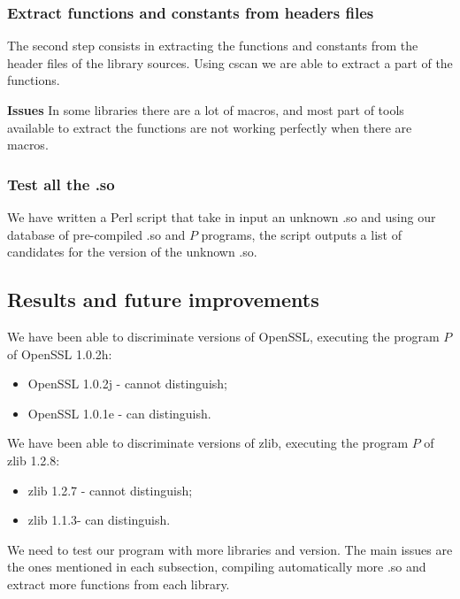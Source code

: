 \documentclass{article}
\begin{document}
   
   	\subsubsection{Extract functions and constants from headers files}
   	
    The second step consists in extracting the functions and constants from
    the header files of the library sources. Using cscan we are able to
    extract a part of the functions.
   	
    \textbf{Issues} In some libraries there are a lot of macros, and most part
    of tools available to extract the functions are not working perfectly when
    there are macros.   		
   	
   	
   	\subsubsection{Test all the .so}
   		
    We have written a Perl script that take in input an unknown .so and using
    our database of pre-compiled .so and $P$ programs, the script outputs a
    list of candidates for the version of the unknown .so.

   	
   	\subsection{Results and future improvements}
   	
        We have been able to discriminate versions of OpenSSL, executing the
        program $P$ of OpenSSL 1.0.2h:
        \begin{itemize}
            \item OpenSSL 1.0.2j - cannot distinguish; 
            \item OpenSSL 1.0.1e - can distinguish.
        \end{itemize}


        We have been able to discriminate versions of zlib, executing the
        program $P$ of zlib 1.2.8: 
        \begin{itemize}
            \item zlib 1.2.7 - cannot distinguish; 
            \item zlib 1.1.3- can distinguish.
        \end{itemize}


   	
        We need to test our program with more libraries and version. The main
        issues are the ones mentioned in each subsection, compiling
        automatically more .so and extract more functions from each library.
\end{document}
